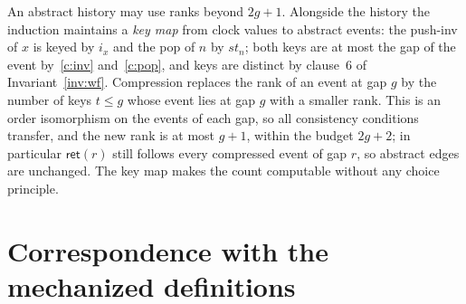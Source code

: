 \documentclass[11pt]{article}
\theoremstyle{definition}
\theoremstyle{remark}
\newcommand{\ret}{\mathsf{ret}}
\begin{document}
An abstract history may use ranks beyond \(2g+1\).  Alongside the history
the induction maintains a \emph{key map} from clock values to abstract
events: the push-inv of \(x\) is keyed by \(i_x\) and the pop of \(n\) by
\(st_n\); both keys are at most the gap of the event by~\ref{c:inv}
and~\ref{c:pop}, and keys are distinct by clause~6 of
Invariant~\ref{inv:wf}.  Compression replaces the rank of an event at gap
\(g\) by the number of keys \(t\le g\) whose event lies at gap \(g\) with a
smaller rank.  This is an order isomorphism on the events of each gap, so
all consistency conditions transfer, and the new rank is at most \(g+1\),
within the budget \(2g+2\); in particular \(\ret(r)\) still follows every
compressed event of gap \(r\), so abstract edges are unchanged.  The key map
makes the count computable without any choice principle.

\section{Correspondence with the mechanized definitions}
\end{document}

